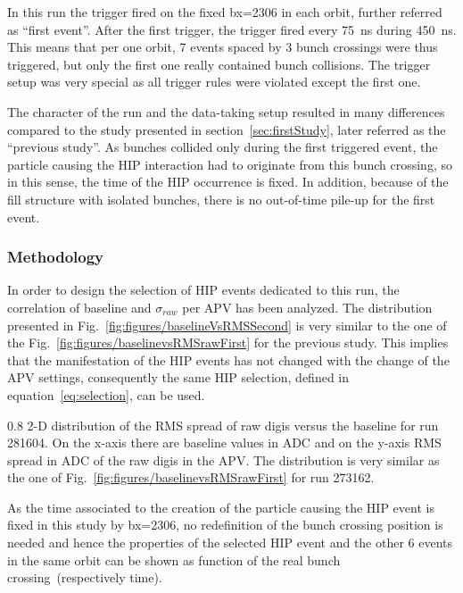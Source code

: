 In this run the trigger fired on the fixed bx=2306 in each orbit, further referred as ``first event''. After the first trigger, the trigger fired every 75~ns during 450~ns. This means that per one orbit, 7 events spaced by 3 bunch crossings were thus triggered, but only the first one really contained bunch collisions. The trigger setup was very special as all trigger rules were violated except the first one.


The character of the run and  the data-taking setup resulted in many differences compared to the study presented in section~\ref{sec:firstStudy}, later referred as the ``previous study''. As bunches collided only during the first triggered event, the particle causing the HIP interaction had to originate from this bunch crossing, so in this sense, the time of the HIP occurrence is fixed. In addition, because of the fill structure with isolated bunches, there is no out-of-time pile-up for the first event.

\subsubsection{Methodology}

In order to design the selection of HIP events dedicated to this run, the correlation of baseline and $\sigma_{raw}$ per APV has been analyzed. The distribution presented in Fig.~\ref{fig:figures/baselineVsRMSSecond} is very similar to the one of the Fig.~\ref{fig:figures/baselinevsRMSrawFirst} for the previous study. This implies that the manifestation of the HIP events has not changed with the change of the APV settings, consequently the same HIP selection, defined in equation~\ref{eq:selection}, can be used.

                 {0.8}       %
                 {2-D distribution of the RMS spread of raw digis versus the baseline for run 281604. On the x-axis there are baseline values in ADC and on the y-axis RMS spread in ADC of the raw digis in the APV. The distribution is very similar as the one of Fig.~\ref{fig:figures/baselinevsRMSrawFirst} for run 273162. } %

As the time associated to the creation of the particle causing the HIP event is fixed in this study by bx=2306, no redefinition of the bunch crossing position is needed and hence the properties of the selected HIP event and the other 6 events in the same orbit can be shown as function of the real bunch crossing~(respectively time).


